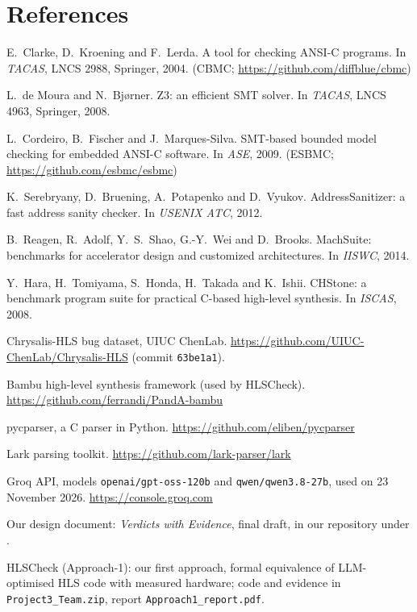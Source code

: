 \documentclass[10pt,a4paper]{article}
\begin{document}
\section*{References}
\begin{enumerate}[label={[\arabic*]},leftmargin=2em]
\item E.~Clarke, D.~Kroening and F.~Lerda. A tool for checking ANSI-C programs. In \emph{TACAS},
LNCS 2988, Springer, 2004. (CBMC; \url{https://github.com/diffblue/cbmc})
\item L.~de Moura and N.~Bj{\o}rner. Z3: an efficient SMT solver. In \emph{TACAS}, LNCS 4963,
Springer, 2008.
\item L.~Cordeiro, B.~Fischer and J.~Marques-Silva. SMT-based bounded model checking for embedded
ANSI-C software. In \emph{ASE}, 2009. (ESBMC; \url{https://github.com/esbmc/esbmc})
\item K.~Serebryany, D.~Bruening, A.~Potapenko and D.~Vyukov. AddressSanitizer: a fast address
sanity checker. In \emph{USENIX ATC}, 2012.
\item B.~Reagen, R.~Adolf, Y.~S.~Shao, G.-Y.~Wei and D.~Brooks. MachSuite: benchmarks for
accelerator design and customized architectures. In \emph{IISWC}, 2014.
\item Y.~Hara, H.~Tomiyama, S.~Honda, H.~Takada and K.~Ishii. CHStone: a benchmark program suite
for practical C-based high-level synthesis. In \emph{ISCAS}, 2008.
\item Chrysalis-HLS bug dataset, UIUC ChenLab. \url{https://github.com/UIUC-ChenLab/Chrysalis-HLS}
(commit \texttt{63be1a1}).
\item Bambu high-level synthesis framework (used by HLSCheck). \url{https://github.com/ferrandi/PandA-bambu}
\item pycparser, a C parser in Python. \url{https://github.com/eliben/pycparser}
\item Lark parsing toolkit. \url{https://github.com/lark-parser/lark}
\item Groq API, models \texttt{openai/gpt-oss-120b} and \texttt{qwen/qwen3.8-27b}, used on 23 November
2026. \url{https://console.groq.com}
\item Our design document: \emph{Verdicts with Evidence}, final draft, in our repository under
.
\item HLSCheck (Approach-1): our first approach, formal equivalence of LLM-optimised HLS code with
measured hardware; code and evidence in \texttt{Project3\_Team.zip}, report \texttt{Approach1\_report.pdf}.
\end{enumerate}
\end{document}
